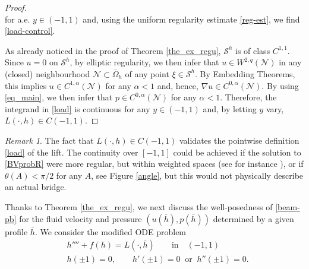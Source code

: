 \documentclass[11pt,a4paper]{amsart}
\theoremstyle{remark}
\newtheorem{remark}[proposition]{Remark}
\theoremstyle{definition}
\numberwithin{equation}{section}
\numberwithin{proposition}{section}
\begin{document}
\begin{proof}
\begin{equation*}
\end{equation*}
for a.e. $y\in(-1,1)$ and, using the uniform regularity estimate \eqref{reg-est}, we find \eqref{load-control}.\par
As already noticed in the proof of Theorem \ref{the_ex_regu}, $\mathcal{S}^h$ is of class $C^{1,1}$. Since $u=0$ on $\mathcal{S}^h$, by
elliptic regularity, we then infer that $u\in W^{2,q}(\mathcal{N})$ in any (closed) neighbourhood $\mathcal{N}\subset\overline{\Omega}_h$ of any
point $\xi\in\mathcal{S}^h$. By Embedding Theorems, this implies $u\in C^{1,\alpha}(\mathcal{N})$ for any $\alpha<1$ and, hence,
$\nabla u\in C^{0,\alpha}(\mathcal{N})$. By using \eqref{eq_main}, we then infer that $p\in C^{0,\alpha}(\mathcal{N})$ for any $\alpha<1$.
Therefore, the integrand in \eqref{load} is continuous for any $y\in(-1,1)$ and, by letting $y$ vary, $L(\cdot, h)\in C(-1,1)$.
\end{proof}

\begin{remark}\label{cont-lift}
The fact that $L(\cdot, h)\in C(-1,1)$ validates the pointwise definition \eqref{load} of the lift.
The continuity over $[-1,1]$ could be achieved if the solution to \eqref{BVprobR} were more regular, but within weighted spaces (see for instance
\cite[Theorem 11.1.5]{Mazya-Rossmann2010}), or if $\theta(A)<\pi/2$ for any $A$, see Figure \ref{angle}, but this would not physically describe an actual bridge.
\end{remark}

Thanks to Theorem \ref{the_ex_regu},  we next discuss the well-posedness of \eqref{beam-pb} for the fluid velocity and pressure $ (u(\overline{h}), p(\overline{h}))$ determined by a given profile $\overline{h}$. We consider the modified ODE problem
\begin{equation}\label{mod-beam-pb}
		\begin{aligned}
			&h''''+ f(h)= L(\cdot, \overline{h})  \qquad \text{in} \quad (-1,1) \\[2pt]
			&h(\pm 1) = 0 , \qquad h'(\pm 1)=0 \ \text{ or } \ h''(\pm 1)=0.
		\end{aligned}
	\end{equation}
\end{document}
